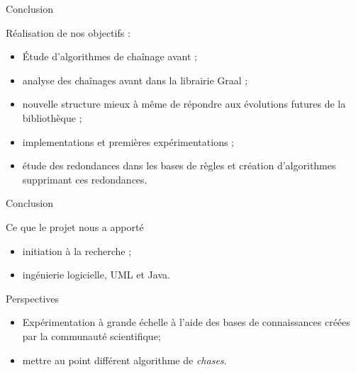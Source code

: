 \begin{frame}{Conclusion}
\begin{block}{Réalisation de nos objectifs :}
    \begin{itemize}
        \item Étude d'algorithmes de chaînage avant ;
        \item analyse des chaînages avant dans la librairie Graal ;
        \item nouvelle structure mieux à même de répondre aux évolutions futures de la bibliothèque ;
        \item implementations et premières expérimentations ;
        \item étude des redondances dans les bases de règles et création d'algorithmes supprimant ces redondances.
    \end{itemize}
\end{block}
    
        
\end{frame}

\begin{frame}{Conclusion}
    \begin{block}{Ce que le projet nous a apporté}
        \begin{itemize}
            \item initiation à la recherche ;
            \item ingénierie logicielle, UML et Java.
        \end{itemize} 
    \end{block}
    \begin{block}{Perspectives}
        \begin{itemize}
            \item Expérimentation à grande échelle à l'aide des bases de connaissances créées par la communauté scientifique;
            \item mettre au point différent algorithme de \textit{chases}.
        \end{itemize}
    \end{block}
\end{frame}